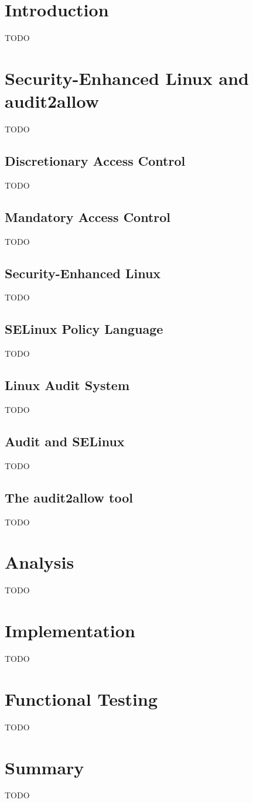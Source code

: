\chapter{Introduction}
TODO

\chapter{Security-Enhanced Linux and audit2allow}
TODO

\section{Discretionary Access Control}
TODO

\section{Mandatory Access Control}
TODO

\section{Security-Enhanced Linux}
TODO

\section{SELinux Policy Language}
TODO

\section{Linux Audit System}
TODO

\section{Audit and SELinux}
TODO

\section{The audit2allow tool}
TODO

\chapter{Analysis}
TODO

\chapter{Implementation}
TODO

\chapter{Functional Testing}
TODO

\chapter{Summary}
TODO
